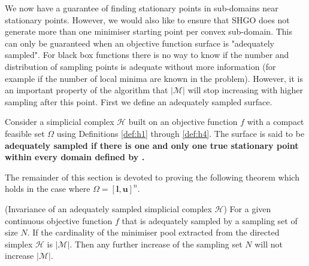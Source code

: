 We now have a guarantee of finding stationary points in sub-domains near stationary points. However, we would also like to ensure that SHGO does not generate more than one minimiser starting point per convex sub-domain. This can only be guaranteed when an objective function surface is "adequately sampled". For black box functions there is no way to know if the number and distribution of sampling points is adequate without more information (for example if the number of local minima are known in the problem). However, it is an important property of the algorithm that $|\mathcal{M}|$ will stop increasing with higher sampling after this point. First we define an adequately sampled surface.

\begin{definition}
Consider a simplicial complex $\mathcal{H}$ built on an objective function $f$ with a compact feasible set $\Omega$ using Definitions \ref{def:h1} through \ref{def:h4}. The surface is said to be \bf{adequately sampled} \normalfont if there is one and only one true stationary point within every domain defined by .
\end{definition}

The remainder of this section is devoted to proving the following theorem which holds in the case where $\Omega = [\mathbf{l}, \mathbf{u}]^n$.

\begin{theorem} \label{theorem:invariance_M} (Invariance of an adequately sampled simplicial complex $\mathcal{H}$) For a given continuous objective function $f$ that is adequately sampled by a sampling set of size $N$. If the cardinality of the minimiser pool extracted from the directed simplex $\mathcal{H}$ is $|\mathcal{M}|$. Then any further increase of the sampling set $N$ will not increase $|\mathcal{M}|$.
\end{theorem}

